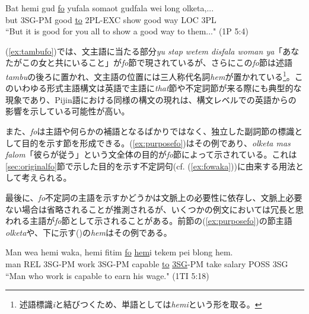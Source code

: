 \begin{exe}
  \ex
  \gll Bat hemi gud \underline{fo} yufala somaot gudfala wei long olketa,...\\
  but 3SG-PM good \underline{to} 2PL-EXC show good way LOC 3PL\\
  \glt ``But it is good for you all to show a good way to them..." (1P 5:4)
\end{exe}

(\ref{ex:tambufo})では、文主語に当たる部分\textit{yu stap wetem disfala woman ya}「あなたがこの女と共にいること」が\textit{fo}節で現されているが、さらにこの\textit{fo}節は述語\textit{tambu}の後ろに置かれ、文主語の位置には三人称代名詞\textit{hem}が置かれている\footnote{
述語標識\textit{i}と結びつくため、単語としては\textit{hemi}という形を取る。}。このいわゆる形式主語構文は英語で主語に\textit{that}節や不定詞節が来る際にも典型的な現象であり\citep[1049, 1391--1392]{english}、Pijin語における同様の構文の現れは、構文レベルでの英語からの影響を示している可能性が高い。

また、\textit{fo}は主語や何らかの補語となるばかりではなく、独立した副詞節の標識として目的を示す節を形成できる。(\ref{ex:purposefo})はその例であり、\textit{olketa mas falom}「彼らが従う」という文全体の目的が\textit{fo}節によって示されている。これは\ref{sec:originalfo}節で示した目的を示す不定詞句(cf. (\ref{ex:fowaka}))に由来する用法として考えられる。

最後に、\textit{fo}不定詞の主語を示すかどうかは文脈上の必要性に依存し、文脈上必要ない場合は省略されることが推測されるが、いくつかの例文においては冗長と思われる主語が\textit{fo}節として示されることがある。前節の(\ref{ex:purposefo})の節主語\textit{olketa}や、下に示す()の\textit{hem}はその例である。

\begin{exe}
  \ex
  \gll Man wea hemi waka, hemi fitim \underline{fo} \underline{hem}i tekem pei blong hem.\\
  man REL 3SG-PM work 3SG-PM capable \underline{to} \underline{3SG}-PM take salary POSS 3SG\\
  \glt ``Man who work is capable to earn his wage." (1TI 5:18)
\end{exe}
